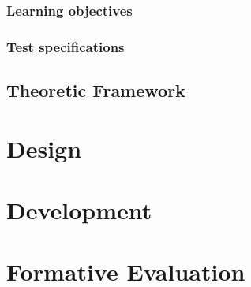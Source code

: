 \documentclass[12pt]{report} %
\begin{document}
\section{Learning objectives}

\section{Test specifications}


\chapter{Theoretic Framework}


\part{Design}


\part{Development}


\part{Formative Evaluation}



\end{document}
